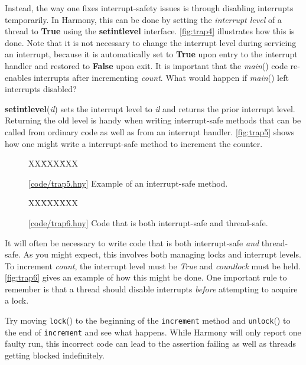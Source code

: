 \documentclass{report}
\newcommand{\harmonysource}[1]{
\begin{tabbing}
XX\=XXX\=XXX\kill
    
\end{tabbing}
}
\newcommand{\harmonylink}[1]{%
[\href{https://harmony.cs.cornell.edu/#1}{\underline{#1}}]%
}
\newenvironment{code}{
\tcolorbox
}{
\endtcolorbox
}
\begin{document}
Instead, the way one fixes interrupt-safety issues is through disabling interrupts
temporarily.  In Harmony, this can be done by setting the \textit{interrupt level}
of a thread to \textbf{True} using the \textbf{setintlevel} interface.
\autoref{fig:trap4} illustrates how this is done.
Note that it is not necessary to change the interrupt level during servicing an
interrupt, because it is automatically set to \textbf{True} upon entry to the interrupt
handler and restored to \textbf{False} upon exit.
It is important that the \textit{main}() code re-enables interrupts after incrementing
\textit{count}.  What would happen if \textit{main}() left interrupts disabled?

\textbf{setintlevel}(\textit{il}) sets the interrupt level to \textit{il} and returns
the prior interrupt level.  Returning the old level is handy when writing interrupt-safe
methods that can be called from ordinary code as well as from an interrupt handler.
\autoref{fig:trap5} shows how one might write a interrupt-safe method
to increment the counter.

\begin{figure}
\begin{code}
\harmonysource{trap5}
\end{code}
\caption{\harmonylink{code/trap5.hny} Example of an interrupt-safe method.}
\label{fig:trap5}
\end{figure}

\begin{figure}
\begin{code}
\harmonysource{trap6}
\end{code}
\caption{\harmonylink{code/trap6.hny} Code that is both interrupt-safe and thread-safe.}
\label{fig:trap6}
\end{figure}

It will often be necessary to write code that is both interrupt-safe \emph{and}
thread-safe.  As you might expect, this involves both managing locks and
interrupt levels.
To increment \textit{count}, the interrupt level must be \textit{True} and
\textit{countlock} must be held.
\autoref{fig:trap6} gives an example of how this might be done.
One important rule to remember is that a thread should disable interrupts \emph{before}
attempting to acquire a lock.

Try moving \texttt{lock}() to the beginning of the \texttt{increment} method
and \texttt{unlock}() to the end of \texttt{increment} and see what happens.
While Harmony will only report one faulty run, this incorrect code can lead to
the assertion failing as well as threads getting blocked indefinitely.
\end{document}
